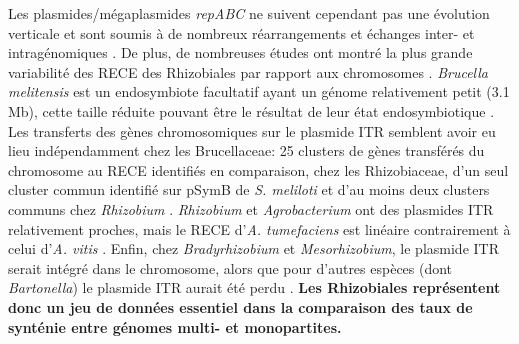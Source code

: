Les plasmides/mégaplasmides \textit{repABC} ne suivent cependant pas une évolution verticale et sont soumis à de nombreux réarrangements et échanges inter- et intragénomiques \citep{Slater2009,Castillo-Ramirez2009}. De plus, de nombreuses études ont montré la plus grande variabilité des RECE des Rhizobiales par rapport aux chromosomes \citep{Slater2009,Bavishi2010}. \textit{Brucella melitensis} est un endosymbiote facultatif ayant un génome relativement petit (3.1 Mb), cette taille réduite pouvant être le résultat de leur état endosymbiotique \citep{Wattam2009}. Les transferts des gènes chromosomiques sur le plasmide ITR semblent avoir eu lieu indépendamment chez les Brucellaceae: 25 clusters de gènes transférés du chromosome au RECE identifiés en comparaison, chez les Rhizobiaceae, d'un seul cluster commun identifié sur pSymB de \textit{S. meliloti} et d'au moins deux clusters communs chez \textit{Rhizobium} \citep{Slater2009}. \textit{Rhizobium} et \textit{Agrobacterium} ont des plasmides ITR relativement proches, mais le RECE d'\textit{A. tumefaciens} est linéaire contrairement à celui d'\textit{A. vitis} \citep{lassalle2013genomes}. Enfin, chez \textit{Bradyrhizobium} et \textit{Mesorhizobium}, le plasmide ITR serait intégré dans le chromosome, alors que pour d'autres espèces (dont \textit{Bartonella}) le plasmide ITR aurait été perdu \citep{Slater2009}. \textbf{Les Rhizobiales représentent donc un jeu de données essentiel dans la comparaison des taux de synténie entre génomes multi- et monopartites.}


